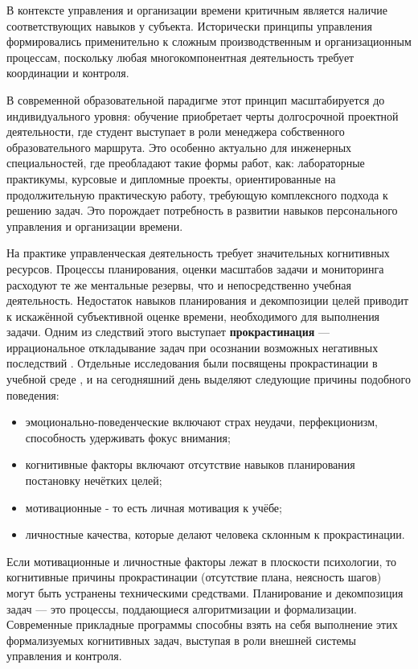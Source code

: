 В контексте управления и организации времени критичным является наличие соответствующих навыков у субъекта. Исторически принципы управления формировались применительно к сложным производственным и организационным процессам, поскольку любая многокомпонентная деятельность требует координации и контроля. 

В современной образовательной парадигме этот принцип масштабируется до индивидуального уровня: обучение приобретает черты долгосрочной проектной деятельности, где студент выступает в роли менеджера собственного образовательного маршрута. Это особенно актуально для инженерных специальностей, где преобладают такие формы работ, как: лабораторные практикумы, курсовые и дипломные проекты, ориентированные на продолжительную практическую работу, требующую комплексного подхода к решению задач. Это порождает потребность в развитии навыков персонального управления и организации времени.

На практике управленческая деятельность требует значительных когнитивных ресурсов. Процессы планирования, оценки масштабов задачи и мониторинга расходуют те же ментальные резервы, что и непосредственно учебная деятельность. Недостаток навыков планирования и декомпозиции целей приводит к искажённой субъективной оценке времени, необходимого для выполнения задачи. Одним из следствий этого выступает \textbf{прокрастинация} --- иррациональное откладывание задач при осознании возможных негативных последствий \cite{Procrastination_Peers}. Отдельные исследования были посвящены прокрастинации в учебной среде \cite{Schouwenburg2004}, и на сегодняшний день выделяют следующие причины подобного поведения:

\begin{itemize}
    \item эмоционально-поведенческие включают страх неудачи, перфекционизм, способность удерживать фокус внимания;
    \item когнитивные факторы включают отсутствие навыков планирования постановку нечётких целей;
    \item мотивационные - то есть личная мотивация к учёбе;
    \item личностные качества, которые делают человека склонным к прокрастинации.
\end{itemize}

Если мотивационные и личностные факторы лежат в плоскости психологии, то когнитивные причины прокрастинации (отсутствие плана, неясность шагов) могут быть устранены техническими средствами. Планирование и декомпозиция задач — это процессы, поддающиеся алгоритмизации и формализации. Современные прикладные программы способны взять на себя выполнение этих формализуемых когнитивных задач, выступая в роли внешней системы управления и контроля.

